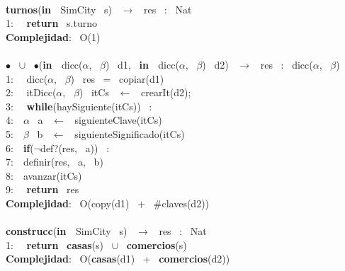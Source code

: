 \\
\noindent\makebox[\linewidth]{\rule{\textwidth}{0.4pt}}
\textbf{turnos}(\textbf{in \ }SimCity \ s) \ $\rightarrow $ \ res \ : \ Nat\\
1: \  \ \textbf{return} \ s.turno\\
\textbf{Complejidad}: \ O(1)\\
\noindent\makebox[\linewidth]{\rule{\textwidth}{0.4pt}}
\\
\noindent\makebox[\linewidth]{\rule{\textwidth}{0.4pt}}
$\bullet$ \ $\cup$ \ $\bullet$(\textbf{in \ }dicc($\alpha$, \ $\beta$) \ d1, \ \textbf{in \ }dicc($\alpha$, \ $\beta$) \ d2) \ $\rightarrow $ \ res \ : \ dicc($\alpha$, \ $\beta$)\\
1: \  \ dicc($\alpha$, \ $\beta$) \ res \ = \ copiar(d1)\\
2: \  \ itDicc($\alpha$, \ $\beta$) \ itCs \ $\leftarrow$ \ crearIt(d2);\\
3: \  \ \textbf{while}(haySiguiente(itCs)) \ :\\
4:\indent  \  \ $\alpha$ \ a \ $\leftarrow$ \ siguienteClave(itCs)\\
5:\indent  \  \ $\beta$ \ b \ $\leftarrow$ \ siguienteSignificado(itCs)\\
6:\indent  \  \ \textbf{if}($\neg$def?(res, \ a)) \ :\\
7:\indent \indent  \  \ definir(res, \ a, \ b)\\
8:\indent  \  \ avanzar(itCs)\\
9: \  \ \textbf{return} \ res\\
\textbf{Complejidad}: \ O(copy(d1) \ + \ $ \# $claves(d2))\\
\noindent\makebox[\linewidth]{\rule{\textwidth}{0.4pt}}
\\
\noindent\makebox[\linewidth]{\rule{\textwidth}{0.4pt}}
\textbf{construcc}(\textbf{in \ }SimCity \ s) \ $\rightarrow $ \ res \ : \ Nat\\
1: \  \ \textbf{return} \ \textbf{casas}(s) \ $\cup$ \ \textbf{comercios}(s)\\
\textbf{Complejidad}: \ O(\textbf{casas}(d1) \ + \ \textbf{comercios}(d2))\\
\noindent\makebox[\linewidth]{\rule{\textwidth}{0.4pt}}
\\
\\